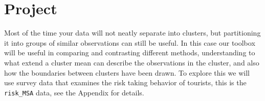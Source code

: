 \documentclass[
  letterpaper,
]{krantz}
\begin{document}

\section*{Project}\label{project-4}


Most of the time your data will not neatly separate into clusters, but
partitioning it into groups of similar observations can still be useful.
In this case our toolbox will be useful in comparing and contrasting
different methods, understanding to what extend a cluster mean can
describe the observations in the cluster, and also how the boundaries
between clusters have been drawn. To explore this we will use survey
data that examines the risk taking behavior of tourists, this is the
\texttt{risk\_MSA} data, see the Appendix for details.
\end{document}
